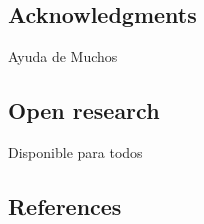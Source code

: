 \documentclass[
]{agujournal2019}
\newlength{\cslhangindent}
\newlength{\cslentryspacingunit} %
\newenvironment{CSLReferences}[2] %
 {%
  \setlength{\parindent}{0pt}
  \ifodd #1
  \let\oldpar\par
  \def\par{\hangindent=\cslhangindent\oldpar}
  \fi
  \setlength{\parskip}{#2\cslentryspacingunit}
 }%
 {}
\begin{document}
\hypertarget{acknowledgments}{%
\subsection{Acknowledgments}\label{acknowledgments}}

Ayuda de Muchos

\hypertarget{open-research}{%
\subsection{Open research}\label{open-research}}

Disponible para todos

\hypertarget{references}{%
\subsection*{References}\label{references}}

\hypertarget{refs}{}
\begin{CSLReferences}{0}{0}
\vspace{1em}

\end{CSLReferences}
\end{document}
